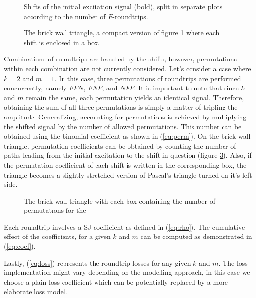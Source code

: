 \documentclass{sigchi}
\begin{document}
\begin{figure}[h]
	\centering
	\scalebox{0.75}{}
	\caption{
		Shifts of the initial excitation signal (bold), split in separate plots according to the number of $F$-roundtrips.
	}
	\label{fig:shifts}
\end{figure}

\begin{figure}[h]
	\centering
	\caption{
		The brick wall triangle, a compact version of figure \ref{fig:shifts} where each shift is enclosed in a box.
	}
	\label{fig:triangle}
\end{figure}

Combinations of roundtrips are handled by the shifts, however, permutations within each combination are not currently considered.
Let's consider a case where $k = 2$ and $m = 1$.
In this case, three permutations of roundtrips are performed concurrently, namely $FFN$, $FNF$, and $NFF$.
It is important to note that since $k$ and $m$ remain the same, each permutation yields an identical signal.
Therefore, obtaining the sum of all three permutations is simply a matter of tripling the amplitude.
Generalizing, accounting for permutations is achieved by multiplying the shifted signal by the number of allowed permutations.
This number can be obtained using the binomial coefficient as shown in (\ref{eq:perm}).
On the brick wall triangle, permutation coefficients can be obtained by counting the number of paths leading from the initial excitation to the shift in question (figure \ref{fig:permutations}).
Also, if the permutation coefficient of each shift is written in the corresponding box, the triangle becomes a slightly stretched version of Pascal's triangle turned on it's left side.

\begin{figure}[h]
	\centering
	\caption{
		The brick wall triangle with each box containing the number of permutations for the 
	}
	\label{fig:permutations}
\end{figure}

Each roundtrip involves a SJ coefficient as defined in (\ref{eq:rho}).
The cumulative effect of the coefficients, for a given $k$ and $m$ can be computed as demonstrated in (\ref{eq:coef}).

Lastly, (\ref{eq:loss}) represents the roundtrip losses for any given $k$ and $m$.
The loss implementation might vary depending on the modelling approach, in this case we choose a plain loss coefficient which can be potentially replaced by a more elaborate loss model.
\end{document}
